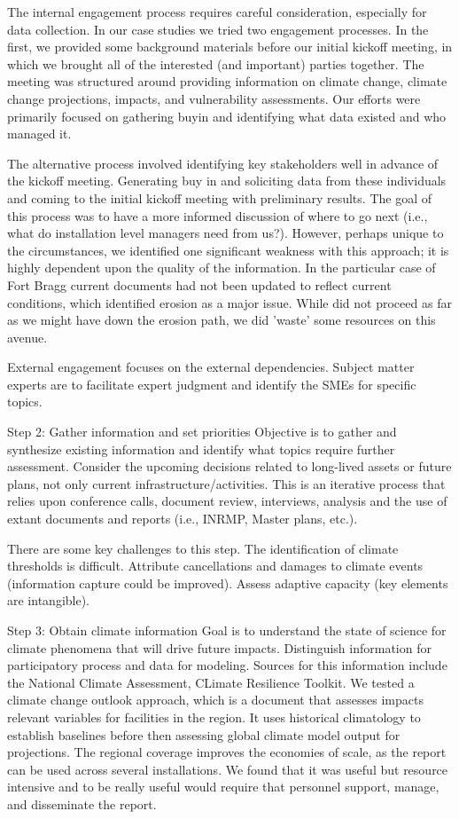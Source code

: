 \documentclass[10pt]{amsart}
\begin{document}
The internal engagement process requires careful consideration, especially for data collection.
In our case studies we tried two engagement processes.
In the first, we provided some background materials before our initial kickoff meeting, in which we brought all of the interested (and important) parties together.
The meeting was structured around providing information on climate change, climate change projections, impacts, and vulnerability assessments.
Our efforts were primarily focused on gathering buyin and identifying what data existed and who managed it. 

The alternative process involved identifying key stakeholders well in advance of the kickoff meeting.
Generating buy in and soliciting data from these individuals and coming to the initial kickoff meeting with preliminary results.
The goal of this process was to have a more informed discussion of where to go next (i.e., what do installation level managers need from us?).
However, perhaps unique to the circumstances, we identified one significant weakness with this approach; it is highly dependent upon the quality of the information.
In the particular case of Fort Bragg current documents had not been updated to reflect current conditions, which identified erosion as a major issue. 
While did not proceed as far as we might have down the erosion path, we did 'waste' some resources on this avenue.

External engagement focuses on the external dependencies.
Subject matter experts are to facilitate expert judgment and identify the SMEs for specific topics.

Step 2: Gather information and set priorities
Objective is to gather and synthesize existing information and identify what topics require further assessment.
Consider the upcoming decisions related to long-lived assets or future plans, not only current infrastructure/activities.
This is an iterative process that relies upon conference calls, document review, interviews, analysis and the use of extant documents and reports (i.e., INRMP, Master plans, etc.).

There are some key challenges to this step.
The identification of climate thresholds is difficult.
Attribute cancellations and damages to climate events (information capture could be improved).
Assess adaptive capacity (key elements are intangible).

Step 3: Obtain climate information
Goal is to understand the state of science for climate phenomena that will drive future impacts.
Distinguish information for participatory process and data for modeling.
Sources for this information include the National Climate Assessment, CLimate Resilience Toolkit.
We tested a climate change outlook approach, which is a document that assesses impacts relevant variables for facilities in the region.
It uses historical climatology to establish baselines before then assessing global climate model output for projections.
The regional coverage improves the economies of scale, as the report can be used across several installations.
We found that it was useful but resource intensive and to be really useful would require that personnel support, manage, and disseminate the report.
\end{document}
